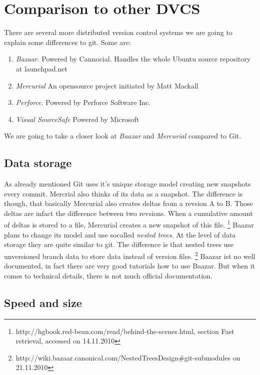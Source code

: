 \section {Comparison to other DVCS}\label{comparisontootherdvcs}

There are several more distributed version control systems
we are going to explain some differences to git.
Some are:

  \begin{enumerate}
     \item \emph{Bazaar}. Powered by Cannocial. Handles the whole Ubuntu source
     repository at launchpad.net
     \item \emph{Mercurial} An opensource project initiated by Matt Mackall
     \item \emph{Perforce}. Powered by Perforce Software Inc.
     \item \emph{Visual SourceSafe} Powered by Microsoft
  \end{enumerate}
  
We are going to take a closer look at \emph{Baazar} and \emph{Mercurial} 
compared to Git.

\subsection {Data storage}

As already mentioned Git uses it's unique storage model creating new snapshots
every commit. Mercrial also thinks of its data as a snapshot. The difference
is though, that basically Mercurial also creates deltas from a revsion A to B.
Those deltas are infact the difference between two revsions. When a cumulative
amount of deltas is stored to a file, Mercurial creates a new snapshot of this file. 
\footnote{\cite {hgbook2009}
http://hgbook.red-bean.com/read/behind-the-scenes.html, section Fast retrieval,
accessed on 14.11.2010}
Baazar plans to change its model and use socalled \emph{nested trees}. At the level of data storage they are quite similar to git. The difference is that nested trees use unversioned branch data to store data instead of version files. \footnote{ http://wiki.bazaar.canonical.com/NestedTreesDesign\#git-submodules on 21.11.2010 } Baazar ist no well documented, in fact there are very good tutorials how to use Baazar. But when it comes to technical details, there is not much official documentation.

\subsection {Speed and size}

